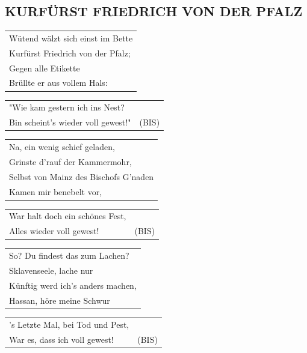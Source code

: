 \documentclass[a4paper, 14pt]{extarticle}
\begin{document}
\subsection*{KURFÜRST FRIEDRICH VON DER PFALZ}
\begin{flushleft}
\begin{tabularx}{\textwidth} {
    >{\raggedright\arraybackslash}X}
Wütend wälzt sich einst im Bette\\
Kurfürst Friedrich von der Pfalz;\\
Gegen alle Etikette\\
Brüllte er aus vollem Hals:\\
\end{tabularx}
\begin{tabularx}{\textwidth} {
    >{\raggedright\arraybackslash}X |c}
"Wie kam gestern ich ins Nest? & \\
Bin scheint’s wieder voll gewest!" & (BIS) \\
\end{tabularx}
\end{flushleft}
\begin{flushleft}
\begin{tabularx}{\textwidth} {
    >{\raggedright\arraybackslash}X}
Na, ein wenig schief geladen,\\
Grinste d’rauf der Kammermohr,\\
Selbst von Mainz des Bischofs G’naden\\
Kamen mir benebelt vor,\\
\end{tabularx}
\begin{tabularx}{\textwidth} {
    >{\raggedright\arraybackslash}X |c}
War halt doch ein schönes Fest, & \\
Alles wieder voll gewest! & (BIS) \\
\end{tabularx}
\end{flushleft}
\begin{flushleft}
\begin{tabularx}{\textwidth} {
    >{\raggedright\arraybackslash}X}
So? Du findest das zum Lachen?\\
Sklavenseele, lache nur\\
Künftig werd ich’s anders machen,\\
Hassan, höre meine Schwur\\
\end{tabularx}
\begin{tabularx}{\textwidth} {
    >{\raggedright\arraybackslash}X |c}
’s Letzte Mal, bei Tod und Pest, & \\
War es, dass ich voll gewest! & (BIS) \\
\end{tabularx}
\end{flushleft}
\end{document}
